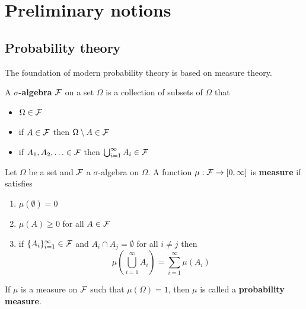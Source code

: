 
\chapter{Preliminary notions}

\section{Probability theory}

The foundation of modern probability theory is based on measure theory.

\begin{definition}
    A \textbf{$\sigma$-algebra} $\mathcal{F}$ on a set $\Omega$ is a collection of subsets of $\Omega$ that
    \begin{itemize}
        \item $\Omega \in \mathcal{F}$
        \item if $A \in \mathcal{F}$ then $\Omega \setminus A \in \mathcal{F}$
        \item if $A_1, A_2, \ldots \in \mathcal{F}$ then $\bigcup_{i = 1}^{\infty} A_i \in \mathcal{F}$
    \end{itemize}
\end{definition}

\begin{definition}[Measure]
    Let $\Omega$ be a set and $\mathcal{F}$ a $\sigma$-algebra on $\Omega$.
    A function $\mu: \mathcal{F} \rightarrow [0, \infty]$ is \textbf{measure} if satisfies
    \begin{enumerate}
        \item $\mu(\emptyset) = 0$
        \item $\mu(A) \geq 0$ for all $A \in \mathcal{F}$
        \item if $\{ A_i \}_{i = 1}^{\infty} \in \mathcal{F}$ and $A_i \cap A_j = \emptyset$ for all $i \neq j$ then
            \begin{equation*}
                \mu \left( \bigcup_{i = 1}^{\infty} A_i \right) 
                = \sum_{i = 1}^{\infty} \mu \left( A_i \right)
            \end{equation*}
    \end{enumerate}
\end{definition}

If $\mu$ is a measure on $\mathcal{F}$ such that $\mu(\Omega) = 1$,
then $\mu$ is called a \textbf{probability measure}.

